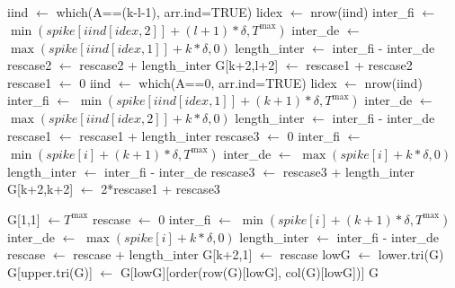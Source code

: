 \documentclass[]{article}
\def\Tmax{T^{\max}}
\begin{document}
\begin{algorithm}[!h]
\begin{algorithmic}[1] 
\State iind $\gets$ which(A==(k-l-1), arr.ind=TRUE) 
\State lidex $\gets$ nrow(iind)
 
\State inter\_fi $\gets$ $\min(spike[iind[idex,2]]+(l+1)*\delta,\Tmax)$
\State inter\_de $\gets$ $\max(spike[iind[idex,1]]+k*\delta,0)$
\State length\_inter $\gets$ inter\_fi - inter\_de
\State rescase2 $\gets$ rescase2 + length\_inter
\EndIf
\EndFor
\State G[k+2,l+2] $\gets$ rescase1 + rescase2
\EndFor
\EndFor
{} 
\State rescase1 $\gets$ 0
\State iind $\gets$ which(A==0, arr.ind=TRUE) 
\State lidex $\gets$ nrow(iind)
 
\State inter\_fi $\gets$ $\min(spike[iind[idex,1]]+(k+1)*\delta,\Tmax)$
\State inter\_de $\gets$ $\max(spike[iind[idex,2]]+k*\delta,0)$
\State length\_inter $\gets$ inter\_fi - inter\_de
\State rescase1 $\gets$ rescase1 + length\_inter
\EndIf
\EndFor
\State rescase3 $\gets$ 0
 
\State inter\_fi $\gets$ $\min(spike[i]+(k+1)*\delta,\Tmax)$
\State inter\_de $\gets$ $\max(spike[i]+k*\delta,0)$
\State length\_inter $\gets$ inter\_fi - inter\_de
\State rescase3 $\gets$ rescase3 + length\_inter
\EndIf
\EndFor
\State G[k+2,k+2] $\gets$ 2*rescase1 + rescase3
\EndFor
{}
\end{algorithmic}
\end{algorithm}

\begin{algorithm}[!h]
\begin{algorithmic}[1] 
\State G[1,1] $\gets \Tmax$
\State rescase $\gets$ 0
 
\State inter\_fi $\gets$ $\min(spike[i]+(k+1)*\delta,\Tmax)$
\State inter\_de $\gets$ $\max(spike[i]+k*\delta,0)$
\State length\_inter $\gets$ inter\_fi - inter\_de
\State rescase $\gets$ rescase + length\_inter
\EndIf
\EndFor
\State G[k+2,1] $\gets$ rescase
\EndFor
\EndIf
\State  lowG $\gets$ lower.tri(G)  
\State  G[upper.tri(G)] $\gets$ G[lowG][order(row(G)[lowG], col(G)[lowG])] 
\State \Return G
\end{algorithmic}
\end{algorithm}
\end{document}

